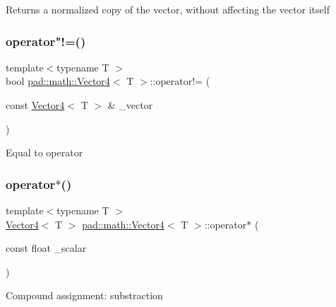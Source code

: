 Returns a normalized copy of the vector, without affecting the vector itself \mbox{\label{structpad_1_1math_1_1_vector4_ad8e026dad9a90b1f38211054b16ff68f}} 
\subsubsection{\texorpdfstring{operator"!=()}{operator!=()}}
{\footnotesize\ttfamily template$<$typename T $>$ \\
bool \mbox{\hyperlink{structpad_1_1math_1_1_vector4}{pad\+::math\+::\+Vector4}}$<$ T $>$\+::operator!= (\begin{DoxyParamCaption}\item[{const \mbox{\hyperlink{structpad_1_1math_1_1_vector4}{Vector4}}$<$ T $>$ \&}]{\+\_\+vector }\end{DoxyParamCaption})}

Equal to operator \mbox{\label{structpad_1_1math_1_1_vector4_a57e32bb850ebd1b9ac4a6adf36ebfbe4}} 
\subsubsection{\texorpdfstring{operator$\ast$()}{operator*()}}
{\footnotesize\ttfamily template$<$typename T $>$ \\
\mbox{\hyperlink{structpad_1_1math_1_1_vector4}{Vector4}}$<$ T $>$ \mbox{\hyperlink{structpad_1_1math_1_1_vector4}{pad\+::math\+::\+Vector4}}$<$ T $>$\+::operator$\ast$ (\begin{DoxyParamCaption}\item[{const float}]{\+\_\+scalar }\end{DoxyParamCaption})}

Compound assignment\+: substraction \mbox{\label{structpad_1_1math_1_1_vector4_a33fee52eb7633acd92f85449d261b820}} 
